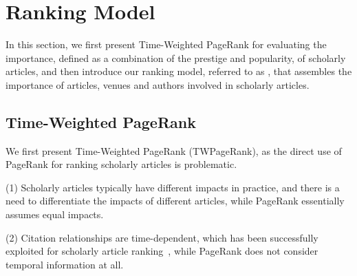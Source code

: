 \section{Ranking Model}
\label{sec-model}

In this section, we first present Time-Weighted PageRank for evaluating  the importance, defined as a combination of the prestige and popularity, of scholarly articles, and then introduce our ranking
model, referred to as \ensemblerank, that assembles the importance of articles, venues and authors involved in scholarly articles.



\subsection{Time-Weighted PageRank}
\label{subsec-twpr}

We first present Time-Weighted PageRank (TWPageRank), as the direct use of PageRank for ranking scholarly articles is problematic.







\noindent(1) Scholarly articles typically have different impacts in practice, and there is a need to differentiate the impacts of different articles, while
 PageRank essentially assumes equal impacts.


\noindent(2)  Citation relationships are time-dependent, which has been successfully exploited for scholarly article ranking~\cite{Li08TSRanking,Wang13AAAI,WangSB13},
while PageRank does not consider temporal information at all.



